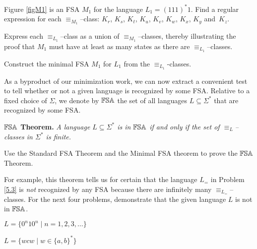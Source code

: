\begin{prb}
Figure \ref{figM1} is an FSA $M_1$ for the language $L_1 = (111)^*1$.  Find a regular expression for each $\equiv_{M_1}$--class:  $K_r$, $K_s$, $K_t$, $K_u$, $K_v$, $K_w$, $K_x$, $K_y$ and~$K_z$.
\end{prb}

\begin{prb}
Express each $\equiv_{L_1}$--class as a union of $\equiv_{M_1}$--classes, thereby illustrating the proof that $M_1$ must have at least as many states as there are $\equiv_{L_1}$--classes.
\end{prb}

\begin{prb}
Construct the minimal FSA $M_1$ for $L_1$ from the $\equiv_{L_1}$-classes.
\end{prb}
\bigskip

As a byproduct of our minimization work, we can now extract a convenient test to tell whether or not a given language is recognized by some FSA.  Relative to a fixed choice of $\Sigma$, we denote by $\mathbb{FSA}$ the set of all languages $L \subseteq \Sigma^*$ that are recognized by some FSA.

\msk

\noindent\textbf{$\mathbb{FSA}$ Theorem.}  {\sl A language $L\subseteq \Sigma^*$ is in\/ $\mathbb{FSA}$ if and only if the set of $\equiv_L$--classes in\/ $\Sigma^*$ is finite.}
\msk


\begin{prb}
Use the Standard FSA Theorem and the Minimal FSA theorem to prove the $\mathbb{FSA}$ Theorem.
\end{prb}

\noindent For example, this theorem tells us for certain that the language $L_=$ in Problem \ref{5.3}  is \emph{not} recognized by any FSA because there are infinitely many $\equiv_{L_=}$--classes.
For the next four problems, demonstrate that the given language $L$ is not in $\mathbb{FSA}$.

\begin{prb}
$L = \{0^n10^n\mid n=1,2,3,\dots\}$
\end{prb}

\begin{prb}
$L = \{wcw\mid w\in \{a,b\}^*\}$
\end{prb}

